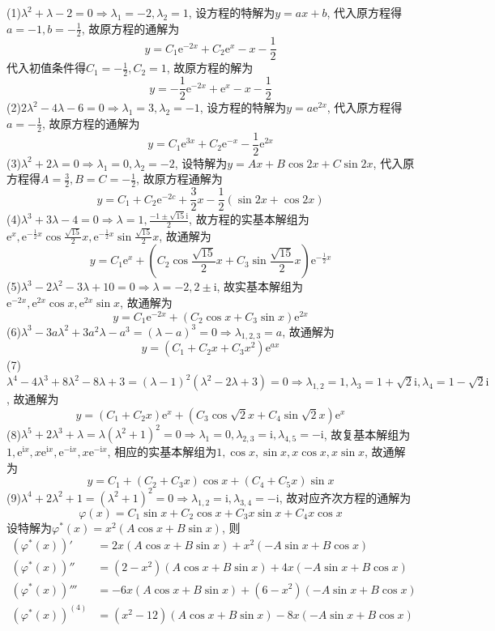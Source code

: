 \documentclass[titlepage,11pt,a4paper,twoside]{report}
\makeatletter
\newcommand\e{\mathrm{e}}
\newcommand\ii{\mathrm{i}}
\newenvironment{solve}{\par
	\pushQED{\qed}%
	\normalfont \topsep1\p@\@plus6\p@\relax
	\trivlist
	\item\relax
	{\hspace*{\parindent}{\heiti 解}\@addpunct{:}}\hspace\labelsep\ignorespaces
}{%
	\popQED\endtrivlist\@endpefalse
}
\makeatother
\begin{document}
\begin{solve}
(1)$\lambda^2+\lambda-2=0\Rightarrow\lambda_1=-2,\lambda_2=1$, 设方程的特解为$y=ax+b$, 代入原方程得$a=-1,b=-\frac{1}{2}$, 故原方程的通解为
\[y=C_1\e^{-2x}+C_2\e^x-x-\frac{1}{2}\]
代入初值条件得$C_1=-\frac{1}{2},C_2=1$, 故原方程的解为
\[y=-\frac{1}{2}\e^{-2x}+\e^x-x-\frac{1}{2}\]
(2)$2\lambda^2-4\lambda-6=0\Rightarrow\lambda_1=3,\lambda_2=-1$, 设方程的特解为$y=a\e^{2x}$, 代入原方程得$a=-\frac{1}{2}$, 故原方程的通解为
\[y=C_1\e^{3x}+C_2\e^{-x}-\frac{1}{2}\e^{2x}\]
(3)$\lambda^2+2\lambda=0\Rightarrow\lambda_1=0,\lambda_2=-2$, 设特解为$y=Ax+B\cos 2x+C\sin2x$, 代入原方程得$A=\frac{3}{2},B=C=-\frac{1}{2}$, 故原方程通解为
\[y=C_1+C_2\e^{-2c}+\frac{3}{2}x-\frac{1}{2}(\sin2x+\cos2x)\]
(4)$\lambda^3+3\lambda-4=0\Rightarrow\lambda=1,\frac{-1\pm\sqrt{15}\ii}{2}$, 故方程的实基本解组为$\e^x,\e^{-\frac{1}{2}x}\cos\frac{\sqrt{15}}{2}x,\e^{-\frac{1}{2}x}\sin\frac{\sqrt{15}}{2}x$, 故通解为
\[y=C_1\e^x+\left(C_2\cos\frac{\sqrt{15}}{2}x+C_3\sin\frac{\sqrt{15}}{2}x\right)\e^{-\frac{1}{2}x}\]
(5)$\lambda^3-2\lambda^2-3\lambda+10=0\Rightarrow\lambda=-2,2\pm\ii$, 故实基本解组为$\e^{-2x},\e^{2x}\cos x,\e^{2x}\sin x$, 故通解为
\[y=C_1\e^{-2x}+(C_2\cos x+C_3\sin x)\e^{2x}\]
(6)$\lambda^3-3a\lambda^2+3a^2\lambda-a^3=(\lambda-a)^3=0\Rightarrow\lambda_{1,2,3}=a$, 故通解为
\[y=\left(C_1+C_2x+C_3x^2\right)\e^{ax}\]
(7)$\lambda^4-4\lambda^3+8\lambda^2-8\lambda+3=(\lambda-1)^2(\lambda^2-2\lambda+3)=0\Rightarrow\lambda_{1,2}=1,\lambda_3=1+\sqrt{2}\ii,\lambda_4=1-\sqrt{2}\ii$, 故通解为
\[y=(C_1+C_2x)\e^x+(C_3\cos\sqrt{2}x+C_4\sin\sqrt{2}x)\e^x\]
(8)$\lambda^5+2\lambda^3+\lambda=\lambda(\lambda^2+1)^2=0\Rightarrow\lambda_1=0,\lambda_{2,3}=\ii,\lambda_{4,5}=-\ii$, 故复基本解组为$1,\e^{\ii x},x\e^{\ii x},\e^{-\ii x},x\e^{-\ii x}$, 相应的实基本解组为$1,\cos x,\sin x,x\cos x,x\sin x$, 故通解为
\[y=C_1+(C_2+C_3x)\cos x+(C_4+C_5x)\sin x\]
(9)$\lambda^4+2\lambda^2+1=(\lambda^2+1)^2=0\Rightarrow\lambda_{1,2}=\ii,\lambda_{3,4}=-\ii$, 故对应齐次方程的通解为
\[\varphi(x)=C_1\sin x+C_2\cos x+C_3x\sin x+C_4x\cos x\]
设特解为$\varphi^*(x)=x^2(A\cos x+B\sin x)$, 则
\[\begin{split}
\left(\varphi^*(x)\right)'&=2x(A\cos x+B\sin x)+x^2(-A\sin x+B\cos x)\\
\left(\varphi^*(x)\right)''&=(2-x^2)(A\cos x+B\sin x)+4x(-A\sin x+B\cos x)\\
\left(\varphi^*(x)\right)'''&=-6x(A\cos x+B\sin x)+(6-x^2)(-A\sin x+B\cos x)\\
\left(\varphi^*(x)\right)^{(4)}&=(x^2-12)(A\cos x+B\sin x)-8x(-A\sin x+B\cos x)
\end{split}\]

\end{solve}
\end{document}
